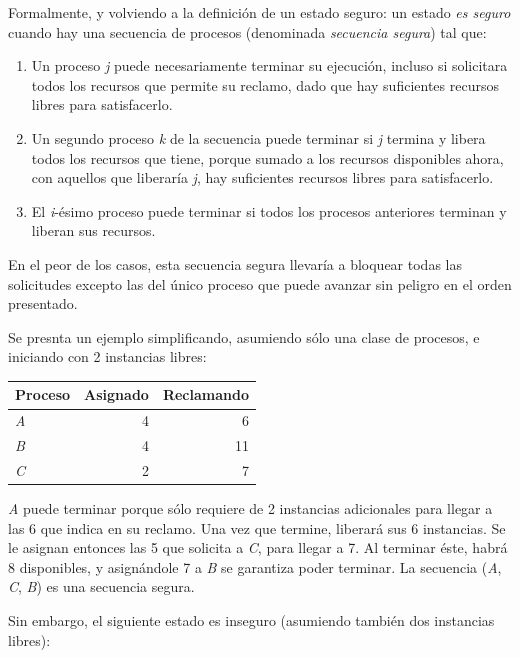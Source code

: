 \documentclass[11pt,fleqn]{book} %
\begin{document}
Formalmente, y volviendo a la definición de un estado seguro: un
estado \emph{es seguro} cuando hay una secuencia de procesos (denominada
\emph{secuencia segura}) tal que:

\begin{enumerate}
\item Un proceso \emph{j} puede necesariamente terminar su ejecución, incluso
   si solicitara todos los recursos que permite su reclamo, dado que
   hay suficientes recursos libres para satisfacerlo.
\item Un segundo proceso \emph{k} de la secuencia puede terminar si \emph{j}
   termina y libera todos los recursos que tiene, porque sumado a los
   recursos disponibles ahora, con aquellos que liberaría \emph{j}, hay
   suficientes recursos libres para satisfacerlo.
\item El \emph{i}-ésimo proceso puede terminar si todos los procesos
   anteriores terminan y liberan sus recursos.
\end{enumerate}

En el peor de los casos, esta secuencia segura llevaría a bloquear
todas las solicitudes excepto las del único proceso que puede avanzar
sin peligro en el orden presentado.

Se presnta un ejemplo simplificando, asumiendo sólo una clase de
procesos, e iniciando con 2 instancias libres:


\begin{center}
\begin{tabular}{lrr}
 Proceso   &  Asignado  &  Reclamando  \\
\hline
 \emph{A}  &         4  &           6  \\
 \emph{B}  &         4  &          11  \\
 \emph{C}  &         2  &           7  \\
\end{tabular}
\end{center}



\emph{A} puede terminar porque sólo requiere de 2 instancias adicionales
para llegar a las 6 que indica en su reclamo. Una vez que termine,
liberará sus 6 instancias. Se le asignan entonces las 5 que solicita a
\emph{C}, para llegar a 7. Al terminar éste, habrá 8 disponibles, y
asignándole 7 a \emph{B} se garantiza poder terminar. La secuencia (\emph{A},
\emph{C}, \emph{B}) es una secuencia segura.

Sin embargo, el siguiente estado es inseguro (asumiendo también dos
instancias libres):
\end{document}

